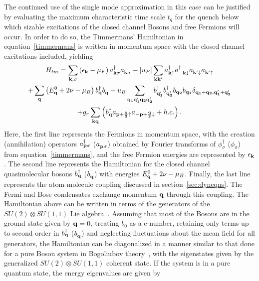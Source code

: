 \documentclass[a4paper,10pt]{article}
\begin{document}
The continued use of the single mode approximation in this case can be justified by evaluating the maximum characteristic time scale $t_q$ for the quench below which sizable excitations of the closed channel Bosons and free Fermions will occur. In order to do so, the Timmermans' Hamiltonian in equation~\ref{timmermans} is written in momentum space with the closed channel excitations included, yielding
\begin{multline}
\label{eq:timmermans:kspace}
H_{tm} = \sum_{{\bf k},\sigma} \left(\epsilon_{\bf k} - \mu_F \right)a^\dagger_{{\bf k}\sigma}a^{ }_{{\bf k}\sigma} - |u_F|\sum_{{\bf k}{\bf k'}}a^\dagger_{{\bf k}\uparrow}a^\dagger_{-{\bf k}\downarrow}a^{ }_{{\bf k'}\downarrow}a^{ }_{{\bf k'}\uparrow}\\
+\sum_{\bf q} \left(E^0_{\bf q}+2\nu-\mu_B \right)b^\dagger_{\bf q}b^{ }_{\bf q} + u_B\sum_{{\bf q_1}{\bf q'_1} {\bf q_2} {\bf q'_2}}b^\dagger_{\bf q'_1}b^\dagger_{\bf q'_2} b_{\bf q_2} b_{\bf q_1}\delta_{{\bf q_1}+{\bf q_2},{\bf q'_1}+{\bf q'_2}}\\
+g_r\sum_{{\bf k}{\bf q}}\left(b^\dagger_{\bf q}a_{{\bf p+\frac{q}{2}}\uparrow}a_{{\bf -p+\frac{q}{2}}\downarrow} + h.c. \right).
\end{multline}
Here, the first line represents the Fermions in momentum space, with the creation (annihilation) operators $a^\dagger_{{\bf p}\sigma}$ ($a^{ }_{{\bf p}\sigma}$) obtained by Fourier transforms of $\phi^\dagger_\sigma$ ($\phi^{ }_\sigma$) from equation~\ref{timmermans}, and the free Fermion energies are represented by $\epsilon_{\bf k}$. The second line represents the Hamiltonian for the closed channel quasimolecular bosons $b^\dagger_{\bf q}$ ($b^{ }_{\bf q}$) with energies $E^0_{\bf q}+2\nu-\mu_B$. Finally, the last line represents the atom-molecule coupling discussed in section~\ref{sec:dyneqns}. The Fermi and Bose condensates exchange momentum ${\bf q}$ through this coupling. The Hamiltonian above can be written in terms of the generators of the $SU(2)\otimes SU(1,1)$ Lie algebra~\cite{huang:becbcs2}. Assuming that most of the Bosons are in the ground state given by ${\bf q}=0$, treating $b_0$ as a c-number, retaining only terms up to second order in $b^\dagger_{\bf q}$ ($b^{ }_{\bf q}$) and neglecting fluctuations about the mean field for all generators, the Hamiltonian can be diagonalized in a manner similar to that done for a pure Boson system in Bogoliubov theory~\cite{huang:becbcs2}, with the eigenstates given by the generalized $SU(2)\otimes SU(1,1)$ coherent state. If the system is in a pure quantum state, the energy eigenvalues are given by~\cite{huang:becbcs2}
\end{document}
